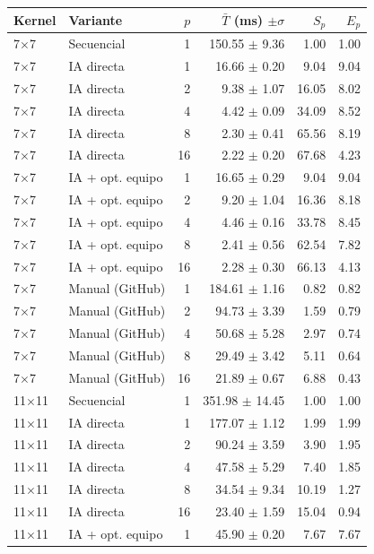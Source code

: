 \begin{tabular}{llrrrr}
\toprule
Kernel & Variante & $p$ & $\bar{T}$ (ms) $\pm\sigma$ & $S_p$ & $E_p$ \\
\midrule
7$\times$7 & Secuencial & 1 & 150.55 $\pm$ 9.36 & 1.00 & 1.00 \\
7$\times$7 & IA directa & 1 & 16.66 $\pm$ 0.20 & 9.04 & 9.04 \\
7$\times$7 & IA directa & 2 & 9.38 $\pm$ 1.07 & 16.05 & 8.02 \\
7$\times$7 & IA directa & 4 & 4.42 $\pm$ 0.09 & 34.09 & 8.52 \\
7$\times$7 & IA directa & 8 & 2.30 $\pm$ 0.41 & 65.56 & 8.19 \\
7$\times$7 & IA directa & 16 & 2.22 $\pm$ 0.20 & 67.68 & 4.23 \\
7$\times$7 & IA + opt. equipo & 1 & 16.65 $\pm$ 0.29 & 9.04 & 9.04 \\
7$\times$7 & IA + opt. equipo & 2 & 9.20 $\pm$ 1.04 & 16.36 & 8.18 \\
7$\times$7 & IA + opt. equipo & 4 & 4.46 $\pm$ 0.16 & 33.78 & 8.45 \\
7$\times$7 & IA + opt. equipo & 8 & 2.41 $\pm$ 0.56 & 62.54 & 7.82 \\
7$\times$7 & IA + opt. equipo & 16 & 2.28 $\pm$ 0.30 & 66.13 & 4.13 \\
7$\times$7 & Manual (GitHub) & 1 & 184.61 $\pm$ 1.16 & 0.82 & 0.82 \\
7$\times$7 & Manual (GitHub) & 2 & 94.73 $\pm$ 3.39 & 1.59 & 0.79 \\
7$\times$7 & Manual (GitHub) & 4 & 50.68 $\pm$ 5.28 & 2.97 & 0.74 \\
7$\times$7 & Manual (GitHub) & 8 & 29.49 $\pm$ 3.42 & 5.11 & 0.64 \\
7$\times$7 & Manual (GitHub) & 16 & 21.89 $\pm$ 0.67 & 6.88 & 0.43 \\
\midrule
11$\times$11 & Secuencial & 1 & 351.98 $\pm$ 14.45 & 1.00 & 1.00 \\
11$\times$11 & IA directa & 1 & 177.07 $\pm$ 1.12 & 1.99 & 1.99 \\
11$\times$11 & IA directa & 2 & 90.24 $\pm$ 3.59 & 3.90 & 1.95 \\
11$\times$11 & IA directa & 4 & 47.58 $\pm$ 5.29 & 7.40 & 1.85 \\
11$\times$11 & IA directa & 8 & 34.54 $\pm$ 9.34 & 10.19 & 1.27 \\
11$\times$11 & IA directa & 16 & 23.40 $\pm$ 1.59 & 15.04 & 0.94 \\
11$\times$11 & IA + opt. equipo & 1 & 45.90 $\pm$ 0.20 & 7.67 & 7.67 \\

\end{tabular}
